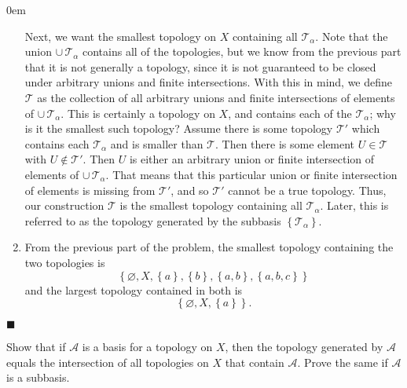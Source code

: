 \documentclass[12pt]{article}
\renewcommand{\qed}{\hfill$\blacksquare$}
\renewenvironment{proof}{\begin{addmargin}[1em]{0em}\begin{newproof}}{\end{newproof}\end{addmargin}\qed}
\newenvironment{problem}[2][Exercise]{\begin{trivlist}
\item[\hskip \labelsep {\bfseries #1}\hskip \labelsep {\bfseries #2.}]}{\end{trivlist}}
\begin{document}
\begin{proof}
\begin{enumerate}[label=(\alph*)]
	Next, we want the smallest topology on $X$ containing all $\mathcal{T}_{\alpha}$. Note that the union $\cup \, \mathcal{T}_{\alpha}$ contains all of the topologies, but we know from the previous part that it is not generally a topology, since it is not guaranteed to be closed under arbitrary unions and finite intersections. With this in mind, we define $\mathcal{T}$ as the collection of all arbitrary unions and finite intersections of elements of $\cup \, \mathcal{T}_{\alpha}$. This is certainly a topology on $X$, and contains each of the $\mathcal{T}_{\alpha}$; why is it the smallest such topology? Assume there is some topology $\mathcal{T}'$ which contains each $\mathcal{T}_{\alpha}$ and is smaller than $\mathcal{T}$. Then there is some element $U\in \mathcal{T}$ with $U \notin \mathcal{T}'$. Then $U$ is either an arbitrary union or finite intersection of elements of $\cup \, \mathcal{T}_{\alpha}$. That means that this particular union or finite intersection of elements is missing from $\mathcal{T}'$, and so $\mathcal{T}'$ cannot be a true topology. Thus, our construction $\mathcal{T}$ is the smallest topology containing all $\mathcal{T}_{\alpha}$. {\color{red}Later, this is referred to as the topology generated by the subbasis $\left\{\mathcal{T}_{\alpha}\right\}$.}
	
	\item From the previous part of the problem, the smallest topology containing the two topologies is $$ \left\{ \varnothing, X, \left\{a\right\}, \left\{b\right\}, \left\{a,b\right\}, \left\{ a,b,c\right\}\right\} $$ and the largest topology contained in both is $$ \left\{ \varnothing, X, \left\{a\right\} \right\}. $$
\end{enumerate}
\end{proof}



\begin{problem}{13.5}
Show that if $\mathcal{A}$ is a basis for a topology on $X$, then the topology generated by $\mathcal{A}$ equals the intersection of all topologies on $X$ that contain $\mathcal{A}$. Prove the same if $\mathcal{A}$ is a subbasis.
\end{problem}
\end{document}
